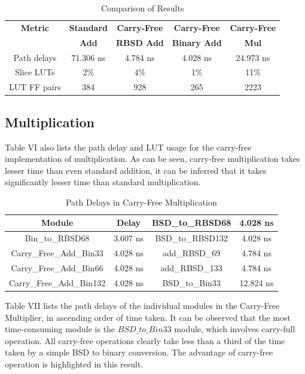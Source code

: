 \documentclass[conference]{IEEEtran}
\begin{document}
\vspace{-.5em}
\begin{table}[h!]
  \centering
  \caption{Comparison of Results}
  \label{tab:table6}
  \begin{tabular}{|c|c|c|c|c|}
    \hline
    \textbf{Metric} & \textbf{Standard} & \textbf{Carry-Free} & \textbf{Carry-Free} & \textbf{Carry-Free} \\
    & \textbf{Add} & \textbf{RBSD Add} & \textbf{Binary Add} & \textbf{Mul} \\
    \hline
    \hline
    Path delays & 71.306 ns & 4.784 ns & 4.028 ns & 24.973 ns \\
    \hline
    Slice LUTs & 2\% & 4\% & 1\% & 11\% \\
    \hline
    LUT FF pairs & 384 & 928 & 265 & 2223 \\
    \hline
  \end{tabular}
\end{table}

\subsection{Multiplication}

Table VI also lists the path delay and LUT usage for the carry-free implementation of multiplication. As can be seen, carry-free multiplication takes lesser time than even standard addition, it can be inferred that it takes significantly lesser time than standard multiplication.

\vspace{-.5em}
\begin{table}[h!]
  \centering
  \caption{Path Delays in Carry-Free Multiplication}
  \label{tab:table7}
  \begin{tabular}{|c|c||c|c|}
    \hline
    \textbf{Module} & \textbf{Delay} & BSD\_to\_RBSD68 & 4.028 ns \\
    \hline
    Bin\_to\_RBSD68 & 3.607 ns & BSD\_to\_RBSD132 & 4.028 ns \\
    \hline
    Carry\_Free\_Add\_Bin33 & 4.028 ns & add\_RBSD\_69 & 4.784 ns \\
    \hline
    Carry\_Free\_Add\_Bin66 & 4.028 ns & add\_RBSD\_133 & 4.784 ns \\
    \hline
    Carry\_Free\_Add\_Bin132 & 4.028 ns & BSD\_to\_Bin33 & 12.824 ns \\
    \hline
  \end{tabular}
\end{table}

Table VII lists the path delays of the individual modules in the Carry-Free Multiplier, in ascending order of time taken. It can be observed that the most time-consuming module is the $BSD\_to\_Bin33$ module, which involves carry-full operation. All carry-free operations clearly take less than a third of the time taken by a simple BSD to binary conversion. The advantage of carry-free operation is highlighted in this result.
\end{document}
